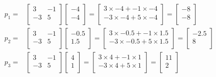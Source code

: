 \documentclass{article}
\begin{document}
\[
	\begin{aligned}
		p_1 = & \begin{bmatrix} 3 & -1 \\ -3 & 5\\ \end{bmatrix} \begin{bmatrix} -4 \\ -4 \\ \end{bmatrix} = \begin{bmatrix} 3 \times -4 + -1 \times -4 \\ -3 \times -4 + 5 \times -4 \\ \end{bmatrix} = \begin{bmatrix} -8 \\ -8 \\ \end{bmatrix}           \\
		p_2 = & \begin{bmatrix} 3 & -1 \\ -3 & 5\\ \end{bmatrix} \begin{bmatrix} -0.5 \\ 1.5 \\ \end{bmatrix} = \begin{bmatrix} 3 \times -0.5 + -1 \times 1.5 \\ -3 \times -0.5 + 5 \times 1.5 \\ \end{bmatrix} = \begin{bmatrix} -2.5 \\ 8 \\ \end{bmatrix} \\
		p_3 = & \begin{bmatrix} 3 & -1 \\ -3 & 5\\ \end{bmatrix} \begin{bmatrix} 4 \\ 1 \\ \end{bmatrix} = \begin{bmatrix} 3 \times 4 + -1 \times 1 \\ -3 \times 4 + 5 \times 1 \\ \end{bmatrix} = \begin{bmatrix} 11 \\ 2 \\ \end{bmatrix}                  \\
	\end{aligned}
\]
\end{document}
